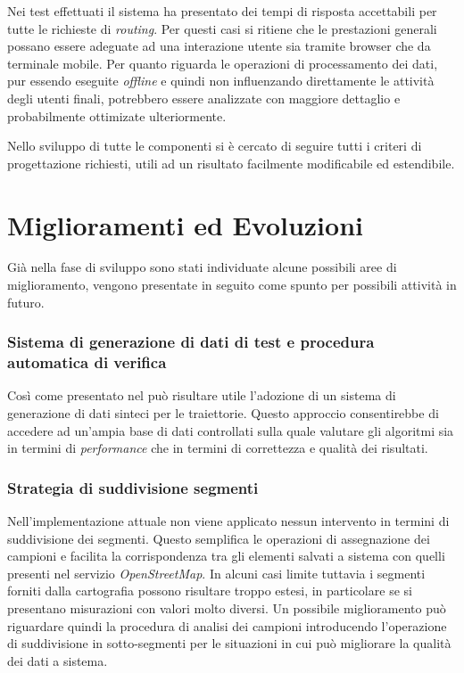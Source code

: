 Nei test effettuati il sistema ha presentato dei tempi di risposta accettabili per tutte le richieste di \emph{routing}. Per questi casi si ritiene che le prestazioni generali possano essere adeguate ad una interazione utente sia tramite browser che da terminale mobile. Per quanto riguarda le operazioni di processamento dei dati, pur essendo eseguite \emph{offline} e quindi non influenzando direttamente le attività degli utenti finali, potrebbero essere analizzate con maggiore dettaglio e probabilmente ottimizate ulteriormente.

Nello sviluppo di tutte le componenti si è cercato di seguire tutti i criteri di progettazione richiesti, utili ad un risultato facilmente modificabile ed estendibile.

\section{Miglioramenti ed Evoluzioni}
Già nella fase di sviluppo sono stati individuate alcune possibili aree di miglioramento, vengono presentate in seguito come spunto per possibili attività in futuro.
\subsubsection{Sistema di generazione di dati di test e procedura automatica di verifica}
Così come presentato nel \cite[capitolo~3.4]{mdme} può risultare utile l'adozione di un sistema di generazione di dati sinteci per le traiettorie. Questo approccio consentirebbe di accedere ad un'ampia base di dati controllati sulla quale valutare gli algoritmi sia in termini di \emph{performance} che in termini di correttezza e qualità dei risultati.

\subsubsection{Strategia di suddivisione segmenti}
Nell'implementazione attuale non viene applicato nessun intervento in termini di suddivisione dei segmenti. Questo semplifica le operazioni di assegnazione dei campioni e facilita la corrispondenza tra gli elementi salvati a sistema con quelli presenti nel servizio \emph{OpenStreetMap}. In alcuni casi limite tuttavia i segmenti forniti dalla cartografia possono risultare troppo estesi, in particolare se si presentano misurazioni con valori molto diversi. Un possibile miglioramento può riguardare quindi la procedura di analisi dei campioni introducendo l'operazione di suddivisione in sotto-segmenti per le situazioni in cui può migliorare la qualità dei dati a sistema.

